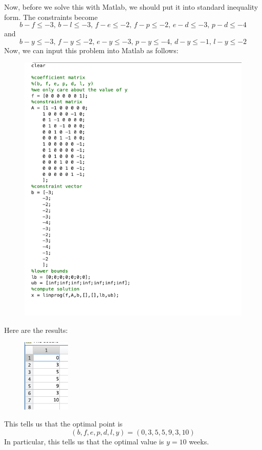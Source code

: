 \documentclass[12pt]{article}
\begin{document}
Now, before we solve this with Matlab, we should put it into standard inequality form. The constraints become
\[
b-f \leq -3,\, b - l \leq -3,\, f-e \leq -2,\, f - p \leq -2,\, e - d \leq -3,\, p - d \leq -4
\] and
\[
b-y \leq -3,\, f - y \leq -2,\, e-y \leq -3,\, p-y \leq - 4,\, d-y \leq -1,\, l - y \leq -2
\] Now, we can input this problem into Matlab as follows:
\begin{figure}[H]
\centering
\includegraphics[width=\textwidth]{matlab}
\end{figure}
Here are the results:
\begin{figure}[H]
\centering
\includegraphics[width=0.2\textwidth]{matlab2}
\end{figure}
This tells us that the optimal point is
\[
(b,f,e,p,d,l,y) =  (0,3,5,5,9,3,10)
\] In particular, this tells us that the optimal value is $y = 10$ weeks.
\newpage
\end{document}
